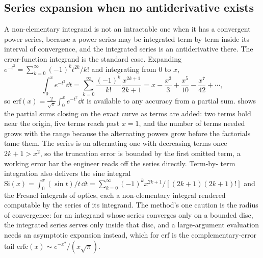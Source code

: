 

\subsection{Series expansion when no antiderivative exists}

A non-elementary integrand is not an intractable one when it has a
convergent power series, because a power series may be integrated term by
term inside its interval of convergence, and the integrated series is an
antiderivative there. The error-function integrand is the standard case.
Expanding $e^{-t^{2}} = \sum_{k=0}^{\infty}(-1)^{k}t^{2k}/k!$ and
integrating from $0$ to $x$,
\[
\int_{0}^{x} e^{-t^{2}}\dd t = \sum_{k=0}^{\infty}\frac{(-1)^{k}}{k!}
\frac{x^{2k+1}}{2k+1} = x - \frac{x^{3}}{3} + \frac{x^{5}}{10} -
\frac{x^{7}}{42} + \cdots,
\]
so $\mathrm{erf}(x) = \tfrac{2}{\sqrt{\pi}}\int_{0}^{x} e^{-t^{2}}\dd t$
is available to any accuracy from a partial sum.
 shows the partial sums closing on the
exact curve as terms are added: two terms hold near the origin, five
terms reach past $x = 1$, and the number of terms needed grows with the
range because the alternating powers grow before the factorials tame
them. The series is an alternating one with decreasing terms once $2k +
1 > x^{2}$, so the truncation error is bounded by the first omitted term,
a working error bar the engineer reads off the series directly. Term-by-
term integration also delivers the sine integral $\mathrm{Si}(x) =
\int_{0}^{x}(\sin t)/t\,\dd t = \sum_{k=0}^{\infty}(-1)^{k}x^{2k+1}/
[(2k+1)(2k+1)!]$ and the Fresnel integrals of optics, each a
non-elementary integral rendered computable by the series of its
integrand. The method's one caution is the radius of convergence: for an
integrand whose series converges only on a bounded disc, the integrated
series serves only inside that disc, and a large-argument evaluation
needs an asymptotic expansion instead, which for $\mathrm{erf}$ is the
complementary-error tail $\mathrm{erfc}(x) \sim e^{-x^{2}}/(x\sqrt{\pi})$.



